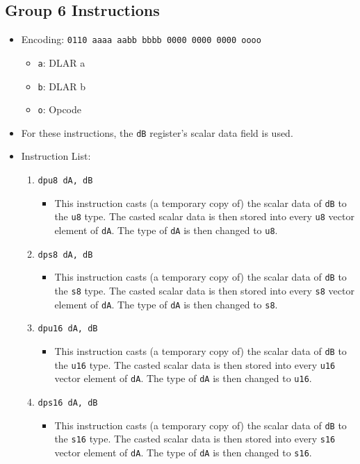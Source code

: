 \documentclass{article}
\begin{document}
	\subsection{Group 6 Instructions}
		\begin{itemize}
		\item Encoding: \texttt{0110 aaaa aabb bbbb  0000 0000 0000 oooo}
			\begin{itemize}
			\item \texttt{a}: DLAR a
			\item \texttt{b}: DLAR b
			\item \texttt{o}: Opcode
			\end{itemize}
		\item For these instructions, the \texttt{dB} register's scalar
			data field is used.
		\item Instruction List:
			\begin{enumerate}
			\item \texttt{dpu8 dA, dB}
				\begin{itemize}
				\item This instruction casts (a temporary copy of) the
					scalar data of \texttt{dB} to the \texttt{u8} type. The
					casted scalar data is then stored into every
					\texttt{u8} vector element of \texttt{dA}. The type of
					\texttt{dA} is then changed to \texttt{u8}.
				\end{itemize}
			\item \texttt{dps8 dA, dB}
				\begin{itemize}
				\item This instruction casts (a temporary copy of) the
					scalar data of \texttt{dB} to the \texttt{s8} type. The
					casted scalar data is then stored into every
					\texttt{s8} vector element of \texttt{dA}. The type of
					\texttt{dA} is then changed to \texttt{s8}.
				\end{itemize}
			\item \texttt{dpu16 dA, dB}
				\begin{itemize}
				\item This instruction casts (a temporary copy of) the
					scalar data of \texttt{dB} to the \texttt{u16} type.
					The casted scalar data is then stored into every
					\texttt{u16} vector element of \texttt{dA}. The type of
					\texttt{dA} is then changed to \texttt{u16}.
				\end{itemize}
			\item \texttt{dps16 dA, dB}
				\begin{itemize}
				\item This instruction casts (a temporary copy of) the
					scalar data of \texttt{dB} to the \texttt{s16} type.
					The casted scalar data is then stored into every
					\texttt{s16} vector element of \texttt{dA}. The type of
					\texttt{dA} is then changed to \texttt{s16}.
				\end{itemize}


\end{enumerate}
\end{itemize}
\end{document}
